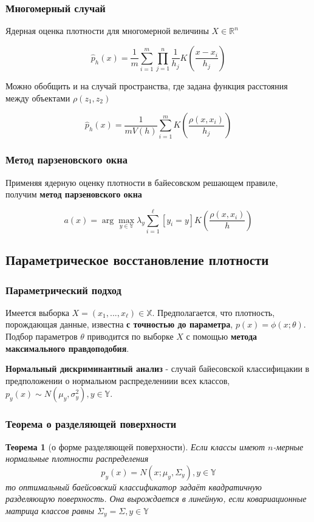 \documentclass{beamer}
\newtheorem{rustheorem}{Теорема}
\begin{document}
	\begin{frame}
		\frametitle{Многомерный случай}
		Ядерная оценка плотности для многомерной величины $X \in \mathbb{R}^n$
		
		\[
		\hat{p}_h(x) = \frac{1}{m} \sum_{i=1}^{m} \prod_{j=1}^{n} \frac{1}{h_j} K \left(\frac{x - x_i}{h_j}\right)
		\]
		
		\vspace{5pt}
		
		Можно обобщить и на случай пространства, где задана функция расстояния между объектами $\rho(z_1, z_2)$ 
		
		 \[
		 \hat{p}_h(x) = \frac{1}{m V(h)} \sum_{i=1}^{m} K \left( \frac{\rho(x, x_i)}{h_j} \right)
		 \]
	\end{frame}
	
	\begin{frame}
		\frametitle{Метод парзеновского окна}
		Применяя ядерную оценку плотности в байесовском решающем правиле, получим \textbf{метод парзеновского окна}
		
		\[
		a(x) = \arg \max_{y \in \mathbb{Y}} \lambda_{y} \sum_{i=1}^{\ell} [y_i = y] K\left(\frac{\rho(x, x_i)}{h} \right)
		\]
	\end{frame}
	
	\subsection{Параметрическое восстановление плотности}
	
	\begin{frame}
		\frametitle{Параметрический подход}
		Имеется выборка $X = (x_1, ..., x_{\ell}) \in \mathbb{X}$. Предполагается, что плотность, порождающая данные, известна \textbf{с точностью до параметра}, $p(x) = \phi(x; \theta)$. Подбор параметров $\theta$ приводится по выборке $X$ с помощью \textbf{метода максимального правдоподобия}.
		
		\vspace{15pt}
		
		\textbf{Нормальный дискриминантный анализ} - случай байесовской классифицакии в предположении о нормальном распределениии всех классов, $p_y(x) \sim N(\mu_y, \sigma_y^2), y \in \mathbb{Y}$.
	\end{frame}
	
	\begin{frame}
		\frametitle{Теорема о разделяющей поверхности}
		\begin{rustheorem}[о форме разделяющей поверхности]
		Если классы имеют $n$-мерные нормальные плотности распределения
		\[
		p_y(x) = N(x; \mu_y, \Sigma_y), y \in \mathbb{Y}
		\]
		то оптимальный баейсовский классификатор задаёт квадратичную разделяющую поверхность.
		Она вырождается в линейную, если ковариационные матрица классов равны $\Sigma_y = \Sigma, y \in \mathbb{Y}$
		\end{rustheorem}
	\end{frame}
	
\end{document}
